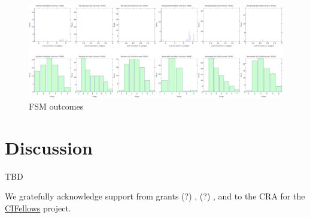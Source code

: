 \documentclass[acmsmall,review,anonymous]{acmart}
\begin{document}
\begin{figure}[t]
  \includegraphics[width=\columnwidth]{img/sample.png}
  \caption{FSM outcomes}
  \label{f:sample}
\end{figure}


\section{Discussion}
\label{s:conclusion}
\label{s:discussion}



\begin{acks}
  TBD

We gratefully acknowledge support from
 grants
  (?) \href{"https://www.nsf.gov/awardsearch/showAward?AWD_ID=1763922"}{},
  (?) \href{"https://www.nsf.gov/awardsearch/showAward?AWD_ID=1823244"}{},
 and
 \href{"https://www.nsf.gov/awardsearch/showAward?AWD_ID=2030859"}{}
  to the CRA for the \href{https://cifellows2020.org}{CIFellows} project.
\end{acks}



\end{document}
